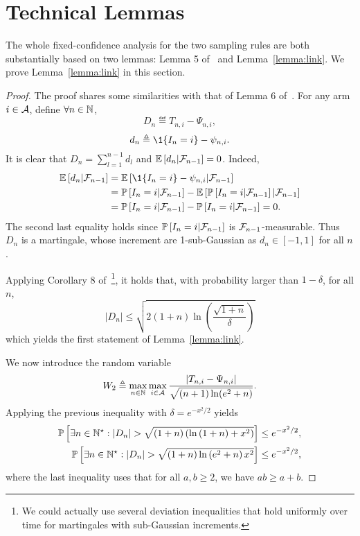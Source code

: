 \section{Technical Lemmas}\label{app:lemmas}

The whole fixed-confidence analysis for the two sampling rules are both substantially based on two lemmas: Lemma 5 of~\cite{qin2017ttei} and Lemma~\ref{lemma:link}. We prove Lemma~\ref{lemma:link} in this section.

\restatewtwo*

\begin{proof}

The proof shares some similarities with that of Lemma 6 of~\cite{qin2017ttei}.
For any arm $i\in\mathcal{A}$, define $\forall n\in{\mathbb N}$,
\[
    D_n \eqdef T_{n,i} - \Psi_{n,i},
\]
\[
    d_n \eqdef \1{\{I_n=i\}} - \psi_{n,i}.
\]
It is clear that $D_n = \sum_{l=1}^{n-1} d_l$ and $\mathbb{E}\left[d_n|\mathcal{F}_{n-1}\right] = 0$. Indeed,
\begin{align*}
    \EE{d_n|\cF_{n-1}} &= \EE{\1{\{I_n=i\}} - \psi_{n,i}|\cF_{n-1}} \\
                       &= \PP{I_n=i|\cF_{n-1}} - \EE{\PP{I_n=i|\cF_{n-1}}|\cF_{n-1}} \\
                       &= \PP{I_n=i|\cF_{n-1}} - \PP{I_n=i|\cF_{n-1}} = 0.
\end{align*}
The second last equality holds since $\mathbb{P}\left[I_n=i|\mathcal{F}_{n-1}\right]$ is $\mathcal{F}_{n-1}$-measurable. Thus $D_n$ is a martingale, whose increment are 1-sub-Gaussian as $d_n \in [-1,1]$ for all $n$. 

Applying Corollary 8 of~\cite{abbasi-yadkori2012}\footnote{We could actually use several deviation inequalities that hold uniformly over time for martingales with sub-Gaussian increments.}, it holds that, with probability larger than $1-\delta$, for all $n$,
\[
    |D_n| \leq \sqrt{2\left(1+n\right)\ln\left(\frac{\sqrt{1+n}}{\delta}\right)}
\]
which yields the first statement of Lemma~\ref{lemma:link}.

We now introduce the random variable
\[
    W_2 \triangleq \max_{n\in{\mathbb N}}\max_{i\in\mathcal{A}} \frac{|T_{n,i}-\Psi_{n,i}|}{\sqrt{(n+1)\ln(e^2+n)}}.
\]
Applying the previous inequality with $\delta = e^{-x^2 / 2}$ yields 
\begin{align*}
          \mathbb{P}\left[\exists n \in \mathbb{N}^\star : |D_n | > \sqrt{\left(1+n\right)\left(\ln\left(1+n \right)+x^2\right)}\right] &\leq e^{-x^2 / 2}, \\
          \mathbb{P}\left[\exists n \in \mathbb{N}^\star : |D_n | > \sqrt{\left(1+n\right)\ln\left(e^2+n \right)x^2}\right] &\leq e^{-x^2 / 2},
\end{align*}
where the last inequality uses that for all $a,b \geq 2$, we have $ab \geq a+b$. 


\end{proof}
